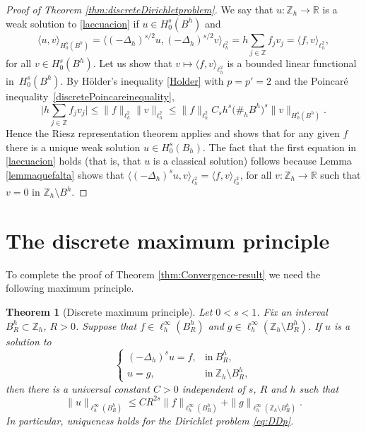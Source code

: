 \documentclass[a4paper,11pt,reqno]{amsart}
\newcommand{\R}{\mathbb{R}}
\newcommand{\Z}{\mathbb{Z}}
\newtheorem{thm}{Theorem}[section]
\theoremstyle{definition}
\numberwithin{equation}{section}
\begin{document}
\begin{proof}[Proof of Theorem \ref{thm:discreteDirichletproblem}]
We say that $u:\Z_h\to\R$ is a weak solution to \eqref{laecuacion} if $u\in H_0^s(B^h)$ and
$$
\langle u,v\rangle_{H^s_0(B^h)}=\langle(-\Delta_h)^{s/2}u,(-\Delta_h)^{s/2}v\rangle_{\ell^2_h}
= h\sum_{j\in\Z}f_jv_j=\langle f,v\rangle_{\ell^2_h},
$$
for all $v\in H_0^s(B^h)$.
Let us show that $v\mapsto\langle f,v\rangle_{\ell^2_h}$ is a bounded linear functional in~$H_0^s(B^h)$.
By H\"older's inequality \eqref{Holder} with $p=p'=2$ and the Poincar\'e inequality~\eqref{discretePoincareinequality},
\[
\bigg|h\sum_{j\in\Z}f_jv_j\bigg|\leq \|f\|_{\ell^2_h}\|v\|_{\ell^2_h}
\leq \|f\|_{\ell^2_h}C_sh^s\big(\#_h B^h\big)^s\|v\|_{H_0^s(B^h)}.
\]
Hence the Riesz representation theorem applies and shows that for any
given $f$ there is a unique weak solution $u\in H_0^s(B_h)$. The fact that the first equation
in \eqref{laecuacion} holds (that is, that $u$ is a classical solution)
follows because Lemma \ref{lemmaquefalta} shows that
$\langle(-\Delta_h)^su,v\rangle_{\ell^2_h}=\langle f,v\rangle_{\ell^2_h}$, for all $v:\Z_h\to\R$
such that $v=0$ in $\Z_h\setminus B^h$.
\end{proof}

\section{The discrete maximum principle}
\label{sec:Dirichlet}

To complete the proof of Theorem \ref{thm:Convergence-result} we need the following maximum principle.

\begin{thm}[Discrete maximum principle]
\label{thm:DiscretePoisson1d}
Let $0<s<1$. Fix an interval $B^h_R\subset\Z_h$, $R>0$.
Suppose that $f\in \ell_h^\infty(B^h_R)$ and $g\in\ell_h^\infty(\Z_h\setminus B^h_R)$.
If $u$ is a solution to
\begin{equation}
\label{eq:DDp}
\begin{cases}
(-\Delta_h)^su=f,&\text{in}~B^h_R, \\
u=g, & \text{in}~\Z_h\setminus B^h_R,
\end{cases}
\end{equation}
then there is a universal constant $C>0$ independent of $s$, $R$ and $h$ such that
\[
\|u\|_{\ell_h^\infty(B^h_R)}\leq CR^{2s}
\|f\|_{\ell_h^\infty(B^h_R)}+\|g\|_{\ell_h^\infty(\Z_h\setminus B_R^h)}.
\]
In particular, uniqueness holds for the Dirichlet problem \eqref{eq:DDp}.
\end{thm}
\end{document}
